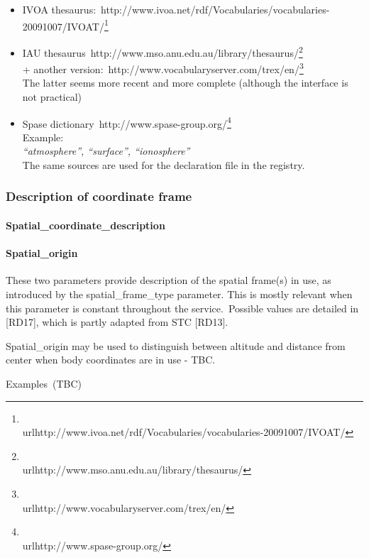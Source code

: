 \documentclass[11pt,a4paper]{ivoa}
\begin{document}
\begin{itemize}
\item IVOA thesaurus: http://www.ivoa.net/rdf/Vocabularies/vocabularies-20091007/IVOAT/\footnote{\\url{http://www.ivoa.net/rdf/Vocabularies/vocabularies-20091007/IVOAT/}}
\item IAU thesaurus http://www.mso.anu.edu.au/library/thesaurus/\footnote{\\url{http://www.mso.anu.edu.au/library/thesaurus/}}\\+ another version: http://www.vocabularyserver.com/trex/en/\footnote{\\url{http://www.vocabularyserver.com/trex/en/}}\\The latter seems more recent and more complete (although the interface is not practical)
\item Spase dictionary http://www.spase-group.org/\footnote{\\url{http://www.spase-group.org/}}\\Example: \\\emph{``atmosphere'', ``surface'', ``ionosphere''}\\The same sources are used for the declaration file in the registry.
\end{itemize}

\subsubsection{Description of coordinate frame}

\paragraph{Spatial\_coordinate\_description}

\paragraph{Spatial\_origin}

These two parameters provide description of the spatial frame(s) in use, as introduced by the spatial\_frame\_type parameter. This is mostly relevant when this parameter is constant throughout the service. Possible values are detailed in [RD17], which is partly adapted from STC [RD13].

Spatial\_origin may be used to distinguish between altitude and distance from center when body coordinates are in use - TBC.

Examples (TBC)
\end{document}
